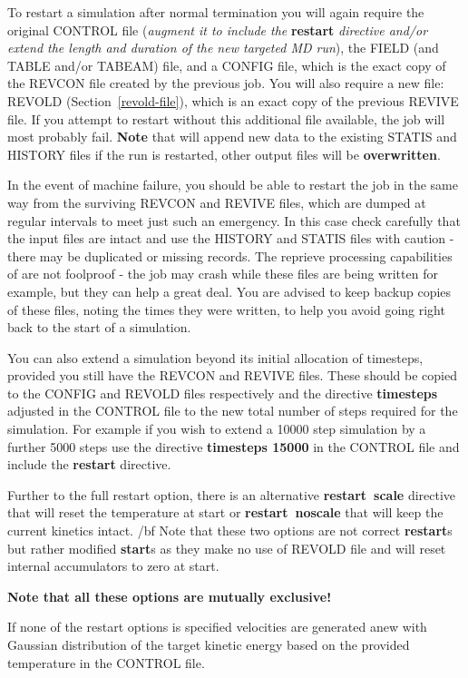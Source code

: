 To restart a simulation after normal termination you will again
require the original CONTROL file ({\em augment it to include the}
{\bf restart} {\em directive and/or extend the length and duration
of the new targeted MD run}), the FIELD (and TABLE and/or TABEAM)
file, and a CONFIG file, which is the exact copy of the REVCON file
created by the previous job.  You will also require a new file:
REVOLD (Section~\ref{revold-file}), which is an exact copy of the
previous REVIVE file.  If you attempt to restart \D without this
additional file available, the job will most probably fail.
{\bf Note} that \D will append new data to the existing STATIS and
HISTORY files if the run is restarted, other output files will be
{\bf overwritten}.

In the event of machine failure, you should be able to restart the
job in the same way from the surviving REVCON and REVIVE files,
which are dumped at regular intervals to meet just such an
emergency.  In this case check carefully that the input files are
intact and use the HISTORY and STATIS files with caution - there
may be duplicated or missing records.  The reprieve processing
capabilities of \D are not foolproof - the job may crash while
these files are being written for example, but they can help a
great deal.  You are advised to keep backup copies of these files,
noting the times they were written, to help you avoid going right
back to the start of a simulation.

You can also extend a simulation beyond its initial allocation of
timesteps, provided you still have the REVCON and REVIVE files.
These should be copied to the CONFIG and REVOLD files respectively
and the directive {\bf timesteps} adjusted in the CONTROL file to
the new total number of steps required for the simulation.  For
example if you wish to extend a 10000 step simulation by a further
5000 steps use the directive {\bf timesteps 15000} in the CONTROL
file and include the {\bf restart} directive.

Further to the full restart option, there is an alternative
{\bf restart~scale} directive that will reset the temperature
at start or {\bf restart~noscale} that will keep the current
kinetics intact. {/bf Note} that these two options are not
correct {\bf restart}s but rather modified {\bf start}s as
they make no use of REVOLD file and will reset internal
accumulators to zero at start.

{\bf Note that all these options are mutually exclusive!}

If none of the restart options is specified velocities are
generated anew with Gaussian distribution of the target kinetic
energy based on the provided temperature in the CONTROL file.

